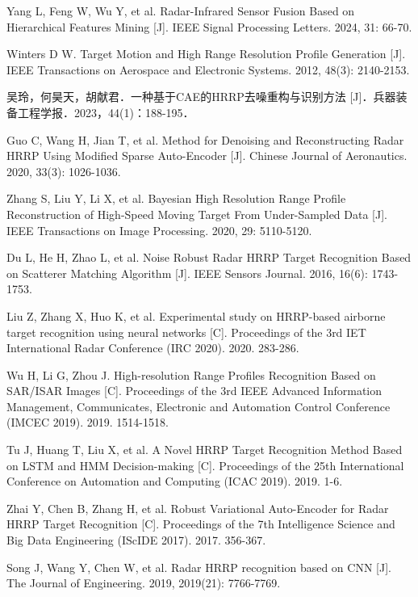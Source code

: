 \documentclass[doctor,twoside,ttf]{nudtpaper}
\begin{document}
\begin{thebibliography}{99}
 Yang L, Feng W, Wu Y, et al. Radar-Infrared Sensor Fusion Based on Hierarchical Features Mining [J]. IEEE Signal Processing Letters. 2024, 31: 66-70.

 Winters D W. Target Motion and High Range Resolution Profile Generation [J]. IEEE Transactions on Aerospace and Electronic Systems. 2012, 48(3): 2140-2153.

 吴玲，何昊天，胡献君．一种基于CAE的HRRP去噪重构与识别方法 [J]．兵器装备工程学报．2023，44(1)：188-195．

 Guo C, Wang H, Jian T, et al. Method for Denoising and Reconstructing Radar HRRP Using Modified Sparse Auto-Encoder [J]. Chinese Journal of Aeronautics. 2020, 33(3): 1026-1036.

 Zhang S, Liu Y, Li X, et al. Bayesian High Resolution Range Profile Reconstruction of High-Speed Moving Target From Under-Sampled Data [J]. IEEE Transactions on Image Processing. 2020, 29: 5110-5120.

 Du L, He H, Zhao L, et al. Noise Robust Radar HRRP Target Recognition Based on Scatterer Matching Algorithm [J]. IEEE Sensors Journal. 2016, 16(6): 1743-1753.

 Liu Z, Zhang X, Huo K, et al. Experimental study on HRRP-based airborne target recognition using neural networks [C]. Proceedings of the 3rd IET International Radar Conference (IRC 2020). 2020. 283-286.

 Wu H, Li G, Zhou J. High-resolution Range Profiles Recognition Based on SAR/ISAR Images [C]. Proceedings of the 3rd IEEE Advanced Information Management, Communicates, Electronic and Automation Control Conference (IMCEC 2019). 2019. 1514-1518.

 Tu J, Huang T, Liu X, et al. A Novel HRRP Target Recognition Method Based on LSTM and HMM Decision-making [C]. Proceedings of the 25th International Conference on Automation and Computing (ICAC 2019). 2019. 1-6.

 Zhai Y, Chen B, Zhang H, et al. Robust Variational Auto-Encoder for Radar HRRP Target Recognition [C]. Proceedings of the 7th Intelligence Science and Big Data Engineering (IScIDE 2017). 2017. 356-367.

 Song J, Wang Y, Chen W, et al. Radar HRRP recognition based on CNN [J]. The Journal of Engineering. 2019, 2019(21): 7766-7769.


\end{thebibliography}
\end{document}
